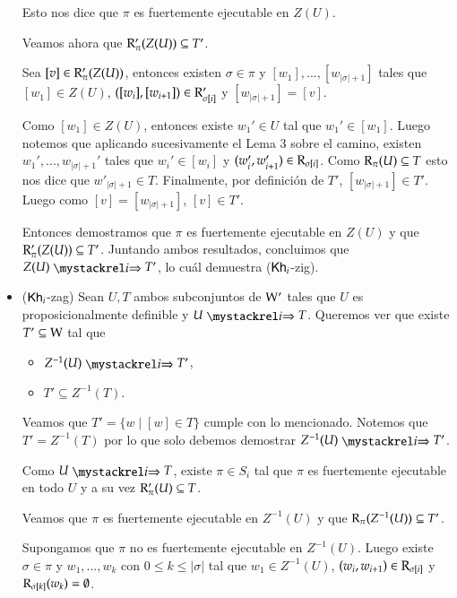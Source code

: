 \begin{demostracion}
\begin{itemize}
        Esto nos dice que $\pi$ es fuertemente ejecutable en $Z(U)$.

        Veamos ahora que $\mathrm{R}'_\pi(Z(U)) \subseteq T'$.

        Sea $[v] \in \mathrm{R}'_\pi(Z(U))$, entonces existen $\sigma \in \pi$ y $[w_1], ..., [w_{|\sigma|+1}]$ tales que $[w_1] \in Z(U)$, $([w_i],[w_{i+1}]) \in \mathrm{R}'_{\sigma[i]}$ y $[w_{|\sigma|+1}] = [v]$.

        Como $[w_1] \in Z(U)$, entonces existe $w_1' \in U$ tal que $w_1'\in [w_1]$. Luego notemos que aplicando sucesivamente el Lema 3 sobre el camino, existen $w_1',...,w_{|\sigma|+1}'$ tales que $w_i' \in [w_i]$ y $(w_i',w_{i+1}')\in \mathrm{R}_{\sigma[i]}$. Como $\mathrm{R}_\pi(U) \subseteq T$ esto nos dice que $w'_{|\sigma|+1} \in T$. Finalmente, por definición de $T'$, $[w_{|\sigma|+1}] \in T'$. Luego como $[v] = [w_{|\sigma|+1}]$, $[v] \in T'$.

        Entonces demostramos que $\pi$ es fuertemente ejecutable en $Z(U)$ y que $\mathrm{R}'_\pi(Z(U)) \subseteq T'$. Juntando ambos resultados, concluimos que $Z(U) \ultsExecAgi T'$, lo cuál demuestra ($\mathsf{Kh}_i$-zig).

       \item ($\mathsf{Kh}_i$-zag) Sean $U,T$ ambos subconjuntos de $\mathrm{W}'$ tales que $U$ es proposicionalmente definible y $U \ultsExecAgi T$. Queremos ver que existe $T' \subseteq \mathrm{W}$ tal que

       \begin{multicols}{2}
            \begin{itemize}
                \item $Z^{-1}(U) \ultsExecAgi T'$, 
                \item $T' \subseteq Z^{-1}(T)$.
            \end{itemize}
        \end{multicols}

        Veamos que $T' = \{w \mid [w] \in T\}$ cumple con lo mencionado. Notemos que $T' = Z^{-1}(T)$ por lo que solo debemos demostrar $Z^{-1}(U) \ultsExecAgi T'$.

        Como $U \ultsExecAgi T$, existe $\pi \in S_i$ tal que $\pi$ es fuertemente ejecutable en todo $U$ y a su vez $\mathrm{R}'_\pi(U) \subseteq T$.

        Veamos que $\pi$ es fuertemente ejecutable en $Z^{-1}(U)$ y que $\mathrm{R}_\pi(Z^{-1}(U)) \subseteq T'$.

        Supongamos que $\pi$ no es fuertemente ejecutable en $Z^{-1}(U)$. Luego existe $\sigma \in \pi$ y $w_1,...,w_k$ con $0 \le k \le |\sigma|$ tal que $w_1 \in Z^{-1}(U)$, $(w_i,w_{i+1}) \in \mathrm{R}_{\sigma[i]}$ y $\mathrm{R}_{\sigma[k]}(w_k) = \emptyset$. 


\end{itemize}
\end{demostracion}
